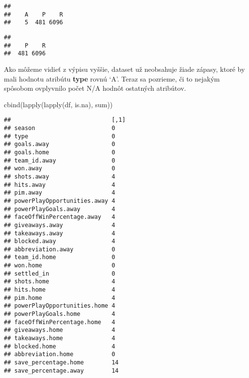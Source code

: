 \documentclass[
]{article}
\newenvironment{Shaded}{\begin{snugshade}}{\end{snugshade}}
\newcommand{\FunctionTok}[1]{\textcolor[rgb]{0.00,0.00,0.00}{#1}}
\newcommand{\NormalTok}[1]{#1}
\newcommand{\OtherTok}[1]{\textcolor[rgb]{0.56,0.35,0.01}{#1}}
\newcommand{\SpecialCharTok}[1]{\textcolor[rgb]{0.00,0.00,0.00}{#1}}
\newcommand{\StringTok}[1]{\textcolor[rgb]{0.31,0.60,0.02}{#1}}
\begin{document}
\begin{verbatim}
## 
##    A    P    R 
##    5  481 6096
\end{verbatim}

\begin{Shaded}
\end{Shaded}

\begin{verbatim}
## 
##    P    R 
##  481 6096
\end{verbatim}

Ako môžeme vidieť z výpisu vyššie, dataset už neobsahuje žiade zápasy,
ktoré by mali hodnotu atribútu \textbf{type} rovnú `A'. Teraz sa
pozrieme, či to nejakým spôsobom ovplyvnilo počet N/A hodnôt ostatných
atribútov.

\begin{Shaded}
\begin{Highlighting}[]
\FunctionTok{cbind}\NormalTok{(}\FunctionTok{lapply}\NormalTok{(}\FunctionTok{lapply}\NormalTok{(df, is.na), sum))}
\end{Highlighting}
\end{Shaded}

\begin{verbatim}
##                             [,1]
## season                      0   
## type                        0   
## goals.away                  0   
## goals.home                  0   
## team_id.away                0   
## won.away                    0   
## shots.away                  4   
## hits.away                   4   
## pim.away                    4   
## powerPlayOpportunities.away 4   
## powerPlayGoals.away         4   
## faceOffWinPercentage.away   4   
## giveaways.away              4   
## takeaways.away              4   
## blocked.away                4   
## abbreviation.away           0   
## team_id.home                0   
## won.home                    0   
## settled_in                  0   
## shots.home                  4   
## hits.home                   4   
## pim.home                    4   
## powerPlayOpportunities.home 4   
## powerPlayGoals.home         4   
## faceOffWinPercentage.home   4   
## giveaways.home              4   
## takeaways.home              4   
## blocked.home                4   
## abbreviation.home           0   
## save_percentage.home        14  
## save_percentage.away        14
\end{verbatim}
\end{document}

